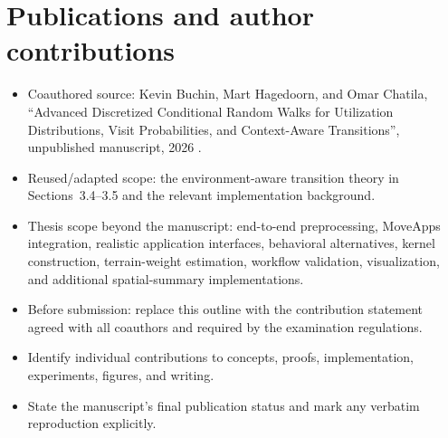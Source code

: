\chapter*{Publications and author contributions}

\begin{itemize}
  \item Coauthored source: Kevin Buchin, Mart Hagedoorn, and Omar Chatila, \enquote{Advanced Discretized Conditional Random Walks for Utilization Distributions, Visit Probabilities, and Context-Aware Transitions}, unpublished manuscript, 2026 \parencite{buchin2026advanced}.
  \item Reused/adapted scope: the environment-aware transition theory in Sections~3.4--3.5 and the relevant implementation background.
  \item Thesis scope beyond the manuscript: end-to-end preprocessing, MoveApps integration, realistic application interfaces, behavioral alternatives, kernel construction, terrain-weight estimation, workflow validation, visualization, and additional spatial-summary implementations.
  \item Before submission: replace this outline with the contribution statement agreed with all coauthors and required by the examination regulations.
  \item Identify individual contributions to concepts, proofs, implementation, experiments, figures, and writing.
  \item State the manuscript's final publication status and mark any verbatim reproduction explicitly.
\end{itemize}

\cleardoublepage
